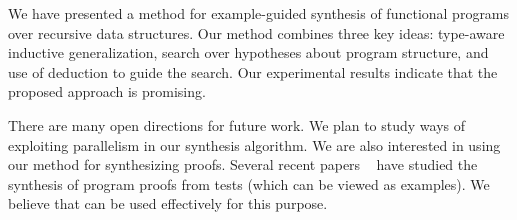 We have presented a method for example-guided synthesis of functional programs
over recursive data structures. Our method combines
three key ideas: type-aware inductive generalization, search
over hypotheses about program structure, and  use of deduction to
guide the search. Our experimental results indicate that the proposed approach is  promising.

There are many open directions for future work. We plan
to study ways of exploiting parallelism in our synthesis algorithm. We
are also interested in using our method for synthesizing 
proofs. Several recent papers ~\cite{SGHALN13,GLMN14} have studied
the synthesis of program proofs  from tests (which can be viewed as
examples). We believe that \sys can be used effectively for this
purpose. %
